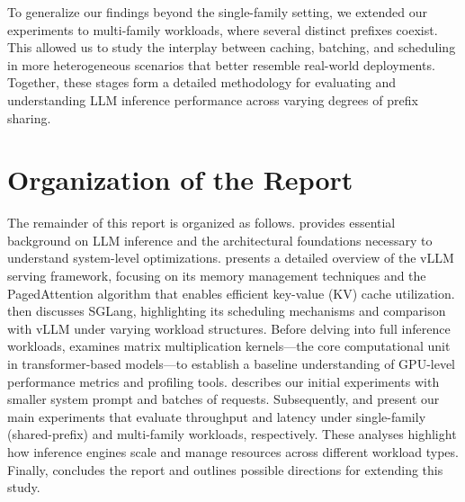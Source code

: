 To generalize our findings beyond the single-family setting, we extended our experiments to multi-family workloads, where several distinct prefixes coexist. This allowed us to study the interplay between caching, batching, and scheduling in more heterogeneous scenarios that better resemble real-world deployments. Together, these stages form a detailed methodology for evaluating and understanding LLM inference performance across varying degrees of prefix sharing.

\section{Organization of the Report}

The remainder of this report is organized as follows.
 provides essential background on LLM inference and the architectural foundations necessary to understand system-level optimizations.  presents a detailed overview of the vLLM serving framework, focusing on its memory management techniques and the PagedAttention algorithm that enables efficient key-value (KV) cache utilization.  then discusses SGLang, highlighting its scheduling mechanisms and comparison with vLLM under varying workload structures. Before delving into full inference workloads,  examines matrix multiplication kernels—the core computational unit in transformer-based models—to establish a baseline understanding of GPU-level performance metrics and profiling tools.  describes our initial experiments with smaller system prompt and batches of requests. Subsequently,  and  present our main experiments that evaluate throughput and latency under single-family (shared-prefix) and multi-family workloads, respectively. These analyses highlight how inference engines scale and manage resources across different workload types. Finally,  concludes the report and outlines possible directions for extending this study.
\endgroup
